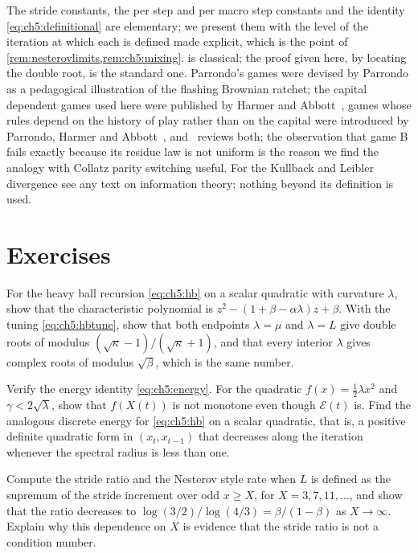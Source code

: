The stride constants, the per step and per macro step constants and the
identity \eqref{eq:ch5:definitional} are elementary; we present them with the
level of the iteration at which each is defined made explicit, which is the
point of \cref{rem:nesterovlimits,rem:ch5:mixing}.   is classical; the proof given here, by
locating the double root, is the standard one.
Parrondo's games were devised by Parrondo as a pedagogical illustration of the flashing Brownian ratchet; the capital dependent games used here were published by Harmer and Abbott~\cite{harmer1999statsci,harmer1999}, games whose rules depend on the history of play rather than on the capital were introduced by Parrondo, Harmer and Abbott~\cite{parrondo2000}, and~\cite{harmer2002} reviews both; the
observation that game B fails exactly because its residue law is not uniform
is the reason we find the analogy with Collatz parity switching useful.  For the Kullback and Leibler divergence see any text on
information theory; nothing beyond its definition is used.

\section*{Exercises}

\begin{exercise}
For the heavy ball recursion \eqref{eq:ch5:hb} on a scalar quadratic with
curvature $\lambda$, show that the characteristic polynomial is
$z^2-(1+\beta-\alpha\lambda)z+\beta$.  With the tuning \eqref{eq:ch5:hbtune},
show that both endpoints $\lambda=\mu$ and $\lambda=L$ give double roots of
modulus $(\sqrt\kappa-1)/(\sqrt\kappa+1)$, and that every interior $\lambda$
gives complex roots of modulus $\sqrt\beta$, which is the same number.
\end{exercise}

\begin{exercise}
Verify the energy identity \eqref{eq:ch5:energy}.  For the quadratic
$f(x)=\tfrac12\lambda x^2$ and $\gamma<2\sqrt\lambda$, show that $f(X(t))$ is
not monotone even though $\mathcal E(t)$ is.  Find the analogous discrete
energy for \eqref{eq:ch5:hb} on a scalar quadratic, that is, a positive
definite quadratic form in $(x_t,x_{t-1})$ that decreases along the
iteration whenever the spectral radius is less than one.
\end{exercise}

\begin{exercise}
Compute the stride ratio and the Nesterov style rate when $L$ is defined as
the supremum of the stride increment over odd $x\ge X$, for $X=3,7,11,\dots$,
and show that the ratio decreases to $\log(3/2)/\log(4/3)=\beta/(1-\beta)$ as
$X\to\infty$.  Explain why this dependence on $X$ is evidence that the stride
ratio is not a condition number.
\end{exercise}

